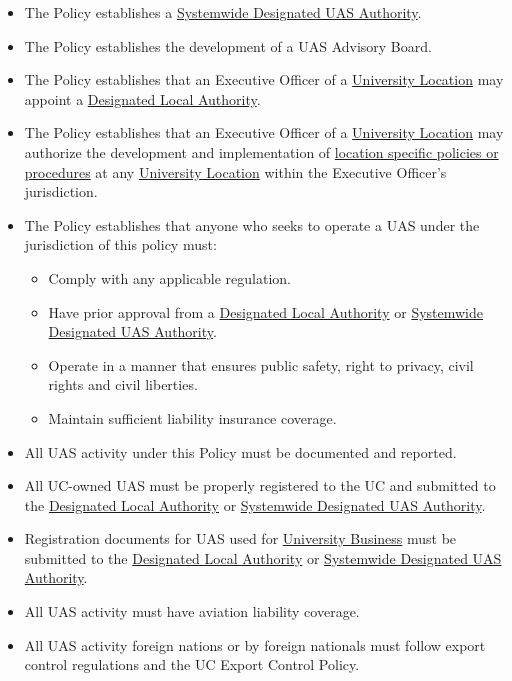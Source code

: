 \documentclass[
]{book}
\providecommand{\tightlist}{%
  \setlength{\itemsep}{0pt}\setlength{\parskip}{0pt}}
\begin{document}
\begin{itemize}
\tightlist
\item
  The Policy establishes a \protect\hyperlink{SDA}{Systemwide Designated UAS Authority}.
\item
  The Policy establishes the development of a UAS Advisory Board.
\item
  The Policy establishes that an Executive Officer of a \protect\hyperlink{UL}{University Location} may appoint a \protect\hyperlink{DLA}{Designated Local Authority}.
\item
  The Policy establishes that an Executive Officer of a \protect\hyperlink{UL}{University Location} may authorize the development and implementation of \protect\hyperlink{LSP}{location specific policies or procedures} at any \protect\hyperlink{UL}{University Location} within the Executive Officer's jurisdiction.
\item
  The Policy establishes that anyone who seeks to operate a UAS under the jurisdiction of this policy must:

  \begin{itemize}
  \tightlist
  \item
    Comply with any applicable regulation.
  \item
    Have prior approval from a \protect\hyperlink{DLA}{Designated Local Authority} or \protect\hyperlink{SDA}{Systemwide Designated UAS Authority}.
  \item
    Operate in a manner that ensures public safety, right to privacy, civil rights and civil liberties.
  \item
    Maintain sufficient liability insurance coverage.
  \end{itemize}
\item
  All UAS activity under this Policy must be documented and reported.
\item
  All UC-owned UAS must be properly registered to the UC and submitted to the \protect\hyperlink{DLA}{Designated Local Authority} or \protect\hyperlink{SDA}{Systemwide Designated UAS Authority}.
\item
  Registration documents for UAS used for \protect\hyperlink{UB}{University Business} must be submitted to the \protect\hyperlink{DLA}{Designated Local Authority} or \protect\hyperlink{SDA}{Systemwide Designated UAS Authority}.
\item
  All UAS activity must have aviation liability coverage.
\item
  All UAS activity foreign nations or by foreign nationals must follow export control regulations and the UC Export Control Policy.
\end{itemize}
\end{document}
